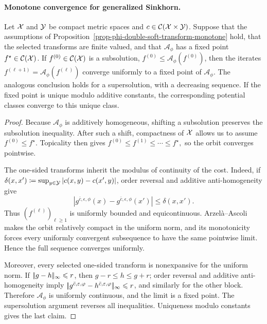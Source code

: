 \paragraph{Monotone convergence for generalized Sinkhorn.}
\begin{prop}\label{prop-fortet-monotone}
Let $\mathcal{X}$ and $\mathcal{Y}$ be compact metric spaces and $c\in\mathcal{C}(\mathcal{X}\times\mathcal{Y})$. Suppose that the assumptions of Proposition~\ref{prop-phi-double-soft-transform-monotone} hold, that the selected transforms are finite valued, and that $\mathcal A_\phi$ has a fixed point $f^\star\in\mathcal{C}(\mathcal{X})$.
If $f^{(0)}\in\mathcal{C}(\mathcal{X})$ is a subsolution, $f^{(0)}\leq\mathcal A_\phi(f^{(0)})$, then the iterates $f^{(\ell+1)}=\mathcal A_\phi(f^{(\ell)})$ converge uniformly to a fixed point of $\mathcal A_\phi$. The analogous conclusion holds for a supersolution, with a decreasing sequence. If the fixed point is unique modulo additive constants, the corresponding potential classes converge to this unique class.
\end{prop}
\begin{proof}
Because $\mathcal A_\phi$ is additively homogeneous, shifting a subsolution preserves the subsolution inequality. After such a shift, compactness of $\mathcal{X}$ allows us to assume $f^{(0)}\leq f^\star$. Topicality then gives
\(f^{(0)}\leq f^{(1)}\leq\cdots\leq f^\star,\)
so the orbit converges pointwise.

The one-sided transforms inherit the modulus of continuity of the cost. Indeed, if
\(\delta(x,x')\coloneqq\sup_{y\in\mathcal{Y}}|c(x,y)-c(x',y)|\),
order reversal and additive anti-homogeneity give
\[
\left|g^{\bar c,\epsilon,\phi}(x)-g^{\bar c,\epsilon,\phi}(x')\right|
\leq \delta(x,x').
\]
Thus $(f^{(\ell)})_{\ell\geq1}$ is uniformly bounded and equicontinuous. Arzel\`a--Ascoli makes the orbit relatively compact in the uniform norm, and its monotonicity forces every uniformly convergent subsequence to have the same pointwise limit. Hence the full sequence converges uniformly.

Moreover, every selected one-sided transform is nonexpansive for the uniform norm. If $|\!| g-h |\!|_\infty\leqslant r$, then $g-r\leq h\leq g+r$; order reversal and additive anti-homogeneity imply $|\!| g^{\bar c,\varepsilon,\varphi}-h^{\bar c,\varepsilon,\varphi} |\!|_\infty\leqslant r$, and similarly for the other block. Therefore $\mathcal A_\phi$ is uniformly continuous, and the limit is a fixed point. The supersolution argument reverses all inequalities. Uniqueness modulo constants gives the last claim.
\end{proof}

